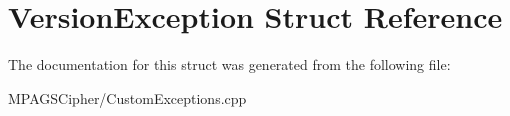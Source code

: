 \hypertarget{struct_version_exception}{\section{Version\-Exception Struct Reference}
\label{struct_version_exception}
}


The documentation for this struct was generated from the following file\-:\begin{DoxyCompactItemize}
\item 
M\-P\-A\-G\-S\-Cipher/Custom\-Exceptions.\-cpp\end{DoxyCompactItemize}
